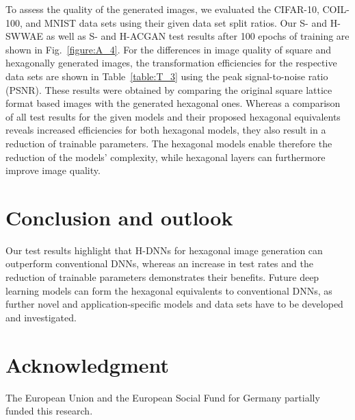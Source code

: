 \documentclass{article}
\begin{document}
To assess the quality of the generated images, we evaluated the CIFAR-10, COIL-100, and MNIST data sets using their given data set split ratios. Our S- and H-SWWAE as well as S- and H-ACGAN test results after 100 epochs of training are shown in Fig.~\ref{figure:A_4}. For the differences in image quality of square and hexagonally generated images, the transformation efficiencies for the respective data sets are shown in Table~\ref{table:T_3} using the peak signal-to-noise ratio (PSNR). These results were obtained by comparing the original square lattice format based images with the generated hexagonal ones. Whereas a comparison of all test results for the given models and their proposed hexagonal equivalents reveals increased efficiencies for both hexagonal models, they also result in a reduction of trainable parameters. The hexagonal models enable therefore the reduction of the models' complexity, while hexagonal layers can furthermore improve image quality.


\section{Conclusion and outlook}

Our test results highlight that H-DNNs for hexagonal image generation can outperform conventional DNNs, whereas an increase in test rates and the reduction of trainable parameters demonstrates their benefits. Future deep learning models can form the hexagonal equivalents to conventional DNNs, as further novel and application-specific models and data sets have to be developed and investigated.


\section{Acknowledgment}

The European Union and the European Social Fund for Germany partially funded this research.




\end{document}
